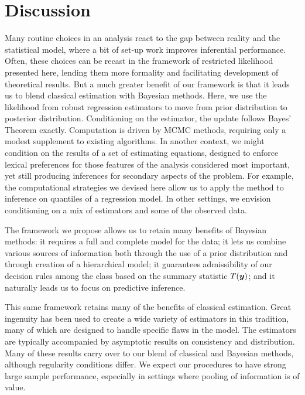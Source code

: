 \documentclass[11pt]{article}
\newcommand{\by}{\mbox{\boldmath $y$}}
\begin{document}
\section{Discussion}
\label{Conclusions}

Many routine choices in an analysis react to the gap between reality and the
statistical model, where a bit of set-up work improves inferential
performance.  Often, these choices can be recast in the framework of
restricted likelihood presented here, lending them more formality and facilitating
development of theoretical results.  But a much greater benefit of our
framework is that it leads us to blend classical estimation with
Bayesian methods.  Here, we use the likelihood from robust regression
estimators to move from prior distribution to posterior distribution.
Conditioning on the estimator, the update follows Bayes' Theorem
exactly.   Computation is driven by MCMC methods, requiring only a modest supplement to existing algorithms.  In another context, we might condition on the results of a set of estimating equations, designed to enforce lexical preferences for those features of the analysis considered most important, yet still producing inferences for secondary aspects of the problem. For example, the computational strategies we devised here allow us to apply the method to inference on quantiles of a regression model. In other settings, we envision conditioning on a mix of estimators and some of the observed data.  

The framework we propose allows us to retain many benefits of Bayesian methods:  it requires a full and complete model for the data; it lets us combine various sources of information both through the use of a prior distribution and through creation of a hierarchical model; it guarantees admissibility of our decision rules among the class based on the summary statistic $T(\by)$; and it naturally leads us to focus on predictive inference.   

This same framework retains many of the benefits of classical estimation.  Great ingenuity has been used to create a wide variety of estimators in this tradition, many of which are designed to handle specific flaws in the model.  The estimators are typically accompanied by asymptotic results on consistency and distribution.  Many of these results carry over to our blend of classical and Bayesian methods, although regularity conditions differ.  We expect our procedures to have strong large sample performance, especially in settings where
pooling of information is of value.  
\end{document}

